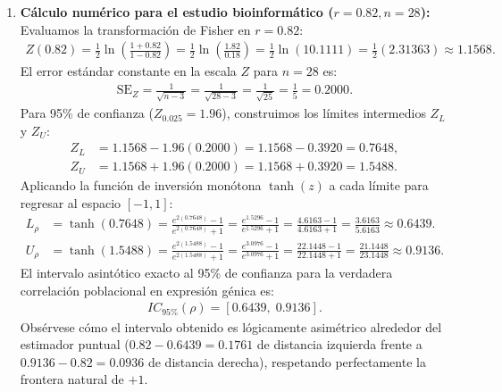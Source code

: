 \begin{solproblema}
\begin{enumerate}
		\item \textbf{Cálculo numérico para el estudio bioinformático ($r = 0.82, n = 28$):}
		Evaluamos la transformación de Fisher en $r = 0.82$:
		\begin{align}
			Z(0.82) = \frac{1}{2} \ln\left( \frac{1 + 0.82}{1 - 0.82} \right) = \frac{1}{2} \ln\left( \frac{1.82}{0.18} \right) = \frac{1}{2} \ln(10.1111) = \frac{1}{2}(2.31363) \approx 1.1568.
		\end{align}
		El error estándar constante en la escala $Z$ para $n = 28$ es:
		\begin{align}
			\text{SE}_Z = \frac{1}{\sqrt{n - 3}} = \frac{1}{\sqrt{28 - 3}} = \frac{1}{\sqrt{25}} = \frac{1}{5} = 0.2000.
		\end{align}
		Para 95\% de confianza ($Z_{0.025} = 1.96$), construimos los límites intermedios $Z_L$ y $Z_U$:
		\begin{align}
			Z_L &= 1.1568 - 1.96(0.2000) = 1.1568 - 0.3920 = 0.7648, \\
			Z_U &= 1.1568 + 1.96(0.2000) = 1.1568 + 0.3920 = 1.5488.
		\end{align}
		Aplicando la función de inversión monótona $\tanh(z)$ a cada límite para regresar al espacio $[-1, 1]$:
		\begin{align}
			L_\rho &= \tanh(0.7648) = \frac{e^{2(0.7648)} - 1}{e^{2(0.7648)} + 1} = \frac{e^{1.5296} - 1}{e^{1.5296} + 1} = \frac{4.6163 - 1}{4.6163 + 1} = \frac{3.6163}{5.6163} \approx 0.6439. \\
			U_\rho &= \tanh(1.5488) = \frac{e^{2(1.5488)} - 1}{e^{2(1.5488)} + 1} = \frac{e^{3.0976} - 1}{e^{3.0976} + 1} = \frac{22.1448 - 1}{22.1448 + 1} = \frac{21.1448}{23.1448} \approx 0.9136.
		\end{align}
		El intervalo asintótico exacto al 95\% de confianza para la verdadera correlación poblacional en expresión génica es:
		\begin{align}
			IC_{95\%}(\rho) = [0.6439, \; 0.9136].
		\end{align}
		Obsérvese cómo el intervalo obtenido es lógicamente asimétrico alrededor del estimador puntual ($0.82 - 0.6439 = 0.1761$ de distancia izquierda frente a $0.9136 - 0.82 = 0.0936$ de distancia derecha), respetando perfectamente la frontera natural de $+1$.
	\end{enumerate}
\end{solproblema}

